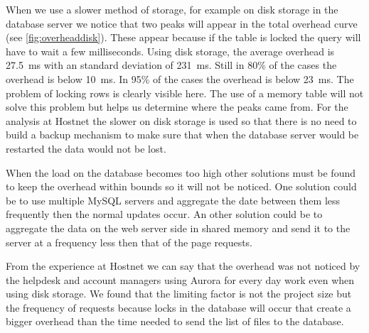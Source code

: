 
When we use a slower method of storage, for example on disk storage in the database server we notice that two peaks will appear in the total overhead curve (see \autoref{fig:overheaddisk}). These appear because if the table is locked the query will have to wait a few milliseconds. Using disk storage, the average overhead is 27.5~ms with an standard deviation of 231~ms. Still in 80\% of the cases the overhead is below 10~ms. In 95\% of the cases the overhead is below 23~ms. The problem of locking rows is clearly visible here. The use of a memory table will not solve this problem but helps us determine where the peaks came from. For the analysis at Hostnet the slower on disk storage is used so that there is no need to build a backup mechanism to make sure that when the database server would be restarted the data would not be lost. 


When the load on the database becomes too high other solutions must be found to keep the overhead within bounds so it will not be noticed. One solution could be to use multiple MySQL servers and aggregate the date between them less frequently then the normal updates occur. An other solution could be to aggregate the data on the web server side in shared memory and send it to the server at a frequency less then that of the page requests.

From the experience at Hostnet we can say that the overhead was not noticed by the helpdesk and account managers using Aurora for every day work even when using disk storage. We found that the limiting factor is not the project size but the frequency of requests because locks in the database will occur that create a bigger overhead than the time needed to send the list of files to the database.

